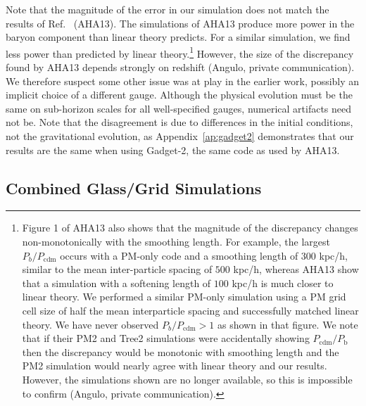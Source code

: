 \documentclass[a4paper,11pt]{article}
\begin{document}
Note that the magnitude of the error in our simulation does not match the results of Ref.~\cite{Angulo:2013} (AHA13). The simulations of AHA13 produce more power in the baryon component than linear theory predicts. For a similar simulation, we find less power than predicted by linear theory.\footnote{Figure 1 of AHA13 also shows that the magnitude of the discrepancy changes non-monotonically with the smoothing length. For example, the largest $P_{b}/P_\mathrm{cdm}$ occurs with a PM-only code and a smoothing length of $300$ kpc/h, similar to the mean inter-particle spacing of $500$ kpc/h, whereas AHA13 show that a simulation with a softening length of $100$ kpc/h is much closer to linear theory. We performed a similar PM-only simulation using a PM grid cell size of half the mean interparticle spacing and successfully matched linear theory. We have never observed $P_{b}/P_\mathrm{cdm} > 1$ as shown in that figure. We note that if their PM2 and Tree2 simulations were accidentally showing $P_\mathrm{cdm}/P_\mathrm{b}$ then the discrepancy would be monotonic with smoothing length and the PM2 simulation would nearly agree with linear theory and our results. However, the simulations shown are no longer available, so this is impossible to confirm (Angulo, private communication).} However, the size of the discrepancy found by AHA13 depends strongly on redshift (Angulo, private communication). We therefore suspect some other issue was at play in the earlier work, possibly an implicit choice of a different gauge. Although the physical evolution must be the same on sub-horizon scales for all well-specified gauges, numerical artifacts need not be. Note that the disagreement is due to differences in the initial conditions, not the gravitational evolution, as Appendix~\ref{ap:gadget2} demonstrates that our results are the same when using Gadget-2, the same code as used by AHA13.

\subsection{Combined Glass/Grid Simulations}
\label{sec:halfglass}
\end{document}
